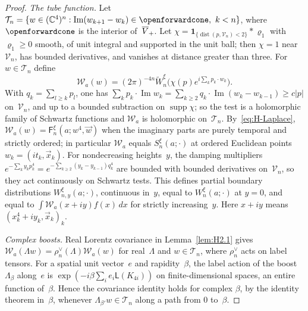 \begin{proof}
\emph{The tube function.} Let $\mathcal T_n=\{w\in(\C^4)^n:\operatorname{Im}(w_{k+1}-w_k)\in\openforwardcone,\ k<n\}$, where $\openforwardcone$ is the interior of~$\overline{V}_+$. Let $\chi=\mathbf1_{\{\operatorname{dist}(p,\mathcal V_n)<2\}}*\varrho_1$ with $\varrho_1\ge0$ smooth, of unit integral and supported in the unit ball; then $\chi=1$ near~$\mathcal V_n$, has bounded derivatives, and vanishes at distance greater than three. For $w\in\mathcal T_n$ define
\begin{equation*}
\mathcal W_a(w)=(2\pi)^{-4n}\widetilde W_n^\xi\bigl(\chi(p)e^{i\sum_kp_k\cdot w_k}\bigr).
\end{equation*}
With $q_k=\sum_{l\ge k}p_l$, one has $\sum_kp_k\cdot\operatorname{Im}w_k=\sum_{k\ge2}q_k\cdot\operatorname{Im}(w_k-w_{k-1})\ge c|p|$ on~$\mathcal V_n$, and up to a bounded subtraction on $\operatorname{supp}\chi$; so the test is a holomorphic family of Schwartz functions and $\mathcal W_a$ is holomorphic on~$\mathcal T_n$. By~\eqref{eq:H-Laplace}, $\mathcal W_a(w)=\mathsf F^\xi_n(a;w^4,\vec w)$ when the imaginary parts are purely temporal and strictly ordered; in particular $\mathcal W_a$ equals $S^\xi_n(a;\cdot)$ at ordered Euclidean points $w_k=(it_k,\vec x_k)$. For nondecreasing heights~$y$, the damping multipliers $e^{-\sum_ky_kp^4_k}=e^{-\sum_{k\ge2}(y_k-y_{k-1})q_k^4}$ are bounded with bounded derivatives on~$\mathcal V_n$, so they act continuously on Schwartz tests. This defines partial boundary distributions $W^\xi_{n,y}(a;\cdot)$, continuous in~$y$, equal to $W^\xi_n(a;\cdot)$ at $y=0$, and equal to $\int\mathcal W_a(x+iy)f(x)\,dx$ for strictly increasing~$y$. Here $x+iy$ means $(x_k^4+iy_k,\vec x_k)_k$.

\emph{Complex boosts.} Real Lorentz covariance in Lemma~\ref{lem:H2.1} gives $\mathcal W_a(\Lambda w)=\rho_n^\vee(\Lambda)\mathcal W_a(w)$ for real~$\Lambda$ and $w\in\mathcal T_n$, where $\rho_n^\vee$ acts on label tensors. For a spatial unit vector~$e$ and rapidity~$\beta$, the label action of the boost $\Lambda_\beta$ along~$e$ is $\exp(-i\beta\sum_ie_i\mathsf L(K_{4i}))$ on finite-dimensional spaces, an entire function of~$\beta$. Hence the covariance identity holds for complex $\beta$, by the identity theorem in~$\beta$, whenever $\Lambda_{\beta'}w\in\mathcal T_n$ along a path from $0$ to~$\beta$.


\end{proof}

